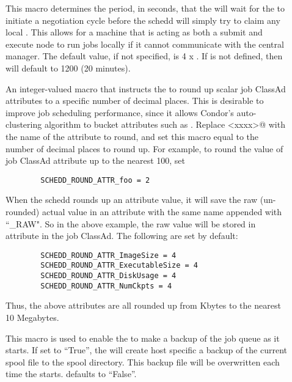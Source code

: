 \begin{description}
\item[]
  \label{param:ScheddAssumeNegotiatorGone} This macro determines the period,
  in seconds, that the  will wait for the  to
  initiate a negotiation cycle before the schedd will simply try to claim
  any local .  This allows for a machine that is acting as
  both a submit and execute node to run jobs locally if it cannot
  communicate with the central manager.  The default value, if not
  specified, is 4 x .  If
   is not defined, then 
   will default to 1200 (20
  minutes).

\item[]
  \label{param:ScheddRoundAttr} An integer-valued macro that
  instructs the  to round up 
  scalar job ClassAd attributes to a specific number of decimal places.  This is desirable to improve job
  scheduling performance, since it allows Condor's auto-clustering algorithm
  to bucket attributes such as .  
  Replace \verb@<xxxx>@ with the name of the attribute to round, and set this
  macro equal to the number of decimal places to round up.  For example, to
  round the value of job ClassAd attribute   up to the nearest
  100, set 
\begin{verbatim}
        SCHEDD_ROUND_ATTR_foo = 2
\end{verbatim}
  When the schedd rounds up an attribute value, it will save the raw 
  (un-rounded) actual value in an attribute with the same name appended
  with ``\_RAW".  So in the above example, the raw value will be stored
  in attribute  in the job ClassAd.
  The following are set by default:
\begin{verbatim}
        SCHEDD_ROUND_ATTR_ImageSize = 4
        SCHEDD_ROUND_ATTR_ExecutableSize = 4
        SCHEDD_ROUND_ATTR_DiskUsage = 4
		SCHEDD_ROUND_ATTR_NumCkpts = 4
\end{verbatim}
  Thus, the above attributes are all rounded up from Kbytes to the nearest
  10 Megabytes.

\item[]
  \label{param:ScheddBackupSpool} This macro is used to enable the
   to make a backup of the job queue as it starts.  If
  set to ``True'', the  will create host specific a
  backup of the current spool file to the spool directory.  This
  backup file will be overwritten each time the 
  starts.   defaults to ``False''.


\end{description}
